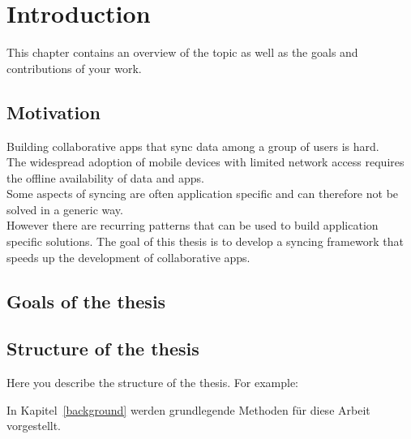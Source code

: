 
\chapter{Introduction}\label{intro}

This chapter contains an overview of the topic as well as the goals and contributions of your work.

\section{Motivation}
Building collaborative apps that sync data among a group of users is
hard.\\The widespread adoption of mobile devices with limited network
access requires the offline availability of data and apps.\\Some aspects
of syncing are often application specific and can therefore not be
solved in a generic way.\\However there are recurring patterns that can
be used to build application specific solutions. The goal of this thesis
is to develop a syncing framework that speeds up the development of
collaborative apps.

\section{Goals of the thesis}

\section{Structure of the thesis}
Here you describe the structure of the thesis. For example:

In Kapitel~\ref{background} werden grundlegende Methoden für diese Arbeit vorgestellt.